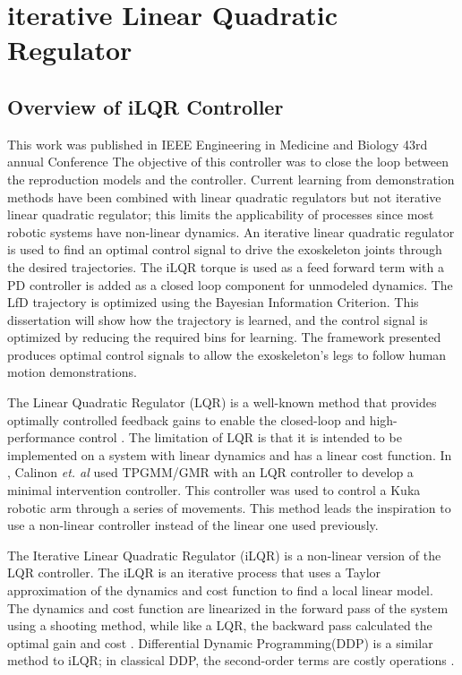 \section{iterative Linear Quadratic Regulator}
\label{sec:ilqr}

\subsection{Overview of iLQR Controller}
This work was published in IEEE Engineering in Medicine and Biology 43rd annual Conference \cite{goldfarb2021control}
The objective of this controller was to close the loop between the reproduction models and the controller. Current learning from demonstration methods have been combined with linear quadratic regulators but not iterative linear quadratic regulator; this limits the applicability of processes since most robotic systems have non-linear dynamics. An iterative linear quadratic regulator is used to find an optimal control signal to drive the exoskeleton joints through the desired trajectories. The iLQR torque is used as a feed forward term with a PD controller is added as a closed loop component for unmodeled dynamics. The LfD trajectory is optimized using the Bayesian Information Criterion. This dissertation will show how the trajectory is learned, and the control signal is optimized by reducing the required bins for learning. The framework presented produces optimal control signals to allow the exoskeleton's legs to follow human motion demonstrations.

The Linear Quadratic Regulator (LQR) is a well-known method that provides optimally controlled feedback gains to enable the closed-loop and high-performance control \cite{kirk2004optimal}. The limitation of LQR is that it is intended to be implemented on a system with linear dynamics and has a linear cost function. In \cite{TPGMM_calinon2016}, Calinon \textit{et. al} used TPGMM/GMR with an LQR controller to develop a minimal intervention controller. This controller was used to control a Kuka robotic arm \cite{schreiber2010fast} through a series of movements. This method leads the inspiration to use a non-linear controller instead of the linear one used previously.  

The Iterative Linear Quadratic Regulator (iLQR) is a non-linear version of the LQR controller. The iLQR is an iterative process that uses a Taylor approximation of the dynamics and cost function to find a local linear model. The dynamics and cost function are linearized in the forward pass of the system using a shooting method, while like a LQR, the backward pass calculated the optimal gain and cost \cite{iLQR_paper}. Differential Dynamic Programming(DDP) is a similar method to iLQR; in classical DDP, the second-order terms are costly operations \cite{iLQR_tassa2014}  \cite{iLQR_Zachary2016}.

